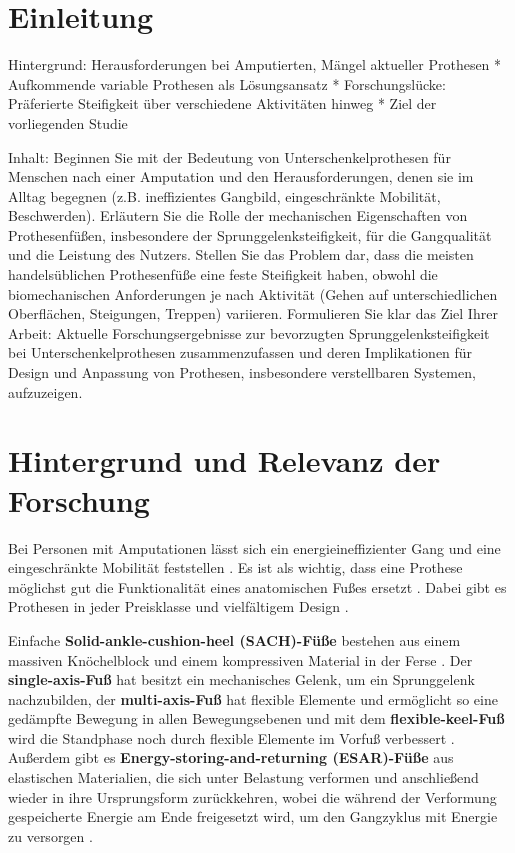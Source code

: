 \section{Einleitung}
Hintergrund: Herausforderungen bei Amputierten, Mängel aktueller Prothesen *   Aufkommende variable Prothesen als Lösungsansatz *   Forschungslücke: Präferierte Steifigkeit über verschiedene Aktivitäten hinweg *   Ziel der vorliegenden Studie

Inhalt: Beginnen Sie mit der Bedeutung von Unterschenkelprothesen für Menschen nach einer Amputation und den Herausforderungen, denen sie im Alltag begegnen (z.B. ineffizientes Gangbild, eingeschränkte Mobilität, Beschwerden). Erläutern Sie die Rolle der mechanischen Eigenschaften von Prothesenfüßen, insbesondere der Sprunggelenksteifigkeit, für die Gangqualität und die Leistung des Nutzers. Stellen Sie das Problem dar, dass die meisten handelsüblichen Prothesenfüße eine feste Steifigkeit haben, obwohl die biomechanischen Anforderungen je nach Aktivität (Gehen auf unterschiedlichen Oberflächen, Steigungen, Treppen) variieren. Formulieren Sie klar das Ziel Ihrer Arbeit: Aktuelle Forschungsergebnisse zur bevorzugten Sprunggelenksteifigkeit bei Unterschenkelprothesen zusammenzufassen und deren Implikationen für Design und Anpassung von Prothesen, insbesondere verstellbaren Systemen, aufzuzeigen.

\section{Hintergrund und Relevanz der Forschung}  %
Bei Personen mit Amputationen lässt sich ein energieineffizienter Gang und eine eingeschränkte Mobilität feststellen \cite{Major.2014}.
Es ist als wichtig, dass eine Prothese möglichst gut die Funktionalität eines anatomischen Fußes ersetzt \cite{Stevens.2018}. Dabei gibt es Prothesen in jeder Preisklasse und vielfältigem Design \cite{Stevens.2018}.

Einfache \textbf{Solid-ankle-cushion-heel (SACH)-Füße} bestehen aus einem massiven Knöchelblock und einem kompressiven Material in der Ferse \cite{Stevens.2018}. Der \textbf{single-axis-Fuß} hat besitzt ein mechanisches Gelenk, um ein Sprunggelenk nachzubilden, der \textbf{multi-axis-Fuß} hat flexible Elemente und ermöglicht so eine gedämpfte Bewegung in allen Bewegungsebenen und mit dem \textbf{flexible-keel-Fuß} wird die Standphase noch durch flexible Elemente im Vorfuß verbessert \cite{Stevens.2018}. 
Außerdem gibt es \textbf{Energy-storing-and-returning (ESAR)-Füße} aus elastischen Materialien, die sich unter Belastung verformen und anschließend wieder in ihre Ursprungsform zurückkehren, wobei die während der Verformung gespeicherte Energie am Ende freigesetzt wird, um den Gangzyklus mit Energie zu versorgen \cite{Stevens.2018}.

